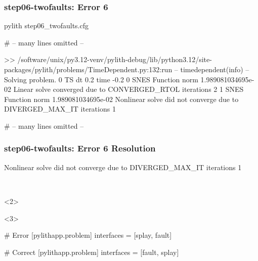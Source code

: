 \documentclass[aspectratio=169]{beamer}
\begin{document}
\begin{frame}[fragile]
  \frametitle{{\ttfamily step06-twofaults}: Error 6}

\begin{bashcode}
pylith step06_twofaults.cfg

# -- many lines omitted --

 >> /software/unix/py3.12-venv/pylith-debug/lib/python3.12/site-packages/pylith/problems/TimeDependent.py:132:run
 -- timedependent(info)
 -- Solving problem.
0 TS dt 0.2 time -0.2
    0 SNES Function norm 1.989081034695e-02
      Linear solve converged due to CONVERGED_RTOL iterations 2
    1 SNES Function norm 1.989081034695e-02
    Nonlinear solve did not converge due to DIVERGED_MAX_IT iterations 1

# -- many lines omitted --
\end{bashcode}

\end{frame}


\begin{frame}[t,fragile]
  \frametitle{{\ttfamily step06-twofaults}: Error 6 Resolution}

  \tserror
  \begin{bashcode}
    Nonlinear solve did not converge due to DIVERGED_MAX_IT iterations 1
  \end{bashcode}

  \pause\\[1pt]

  \begin{onlyenv}<2>
  \end{onlyenv}
  \begin{onlyenv}<3>
  \begin{cfgcode}
    # Error
    [pylithapp.problem]
    interfaces = [splay, fault]

    # Correct
    [pylithapp.problem]
    interfaces = [fault, splay]
  \end{cfgcode}
  \end{onlyenv}

\end{frame}
\end{document}
